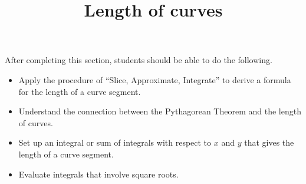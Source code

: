 \documentclass{ximera}
\title{Length of curves}
\begin{document}
\begin{abstract}
\end{abstract}

\maketitle

\begin{sectionOutcomes}

After completing this section, students should be able to do the following.

\begin{itemize}
\item Apply the procedure of ``Slice, Approximate, Integrate'' to derive a formula for the length of a curve segment.
\item Understand the connection between the Pythagorean Theorem and the length of curves.
\item Set up an integral or sum of integrals with respect to $x$ and $y$ that gives the length of a curve segment.
\item Evaluate integrals that involve square roots.
\end{itemize}

\end{sectionOutcomes}
\end{document}
